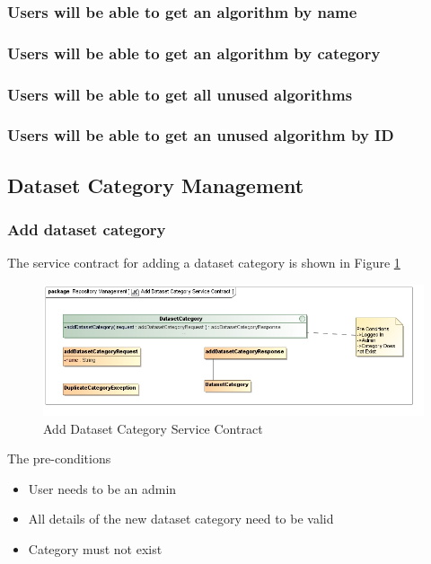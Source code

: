 \subsubsection {Users will be able to get an algorithm by name}
\subsubsection {Users will be able to get an algorithm by category}
\subsubsection {Users will be able to get all unused algorithms}
\subsubsection {Users will be able to get an unused algorithm by ID}

\subsection{Dataset Category Management}

\subsubsection {Add dataset category}
The service contract for adding a dataset category is shown in Figure \ref{fig:addDatasetCatService}
\begin{figure}[H]
  \begin{center}
  \includegraphics[scale=0.6]{../Diagrams and Charts/Test Data/Add Dataset Category Service Contract.jpg}
  \caption{Add Dataset Category Service Contract}
  \label{fig:addDatasetCatService}
  \end{center}
  
\end{figure}

The pre-conditions
\begin{itemize}
  \item User needs to be an admin
  \item All details of the new dataset category need to be valid
  \item Category must not exist
\end{itemize}

